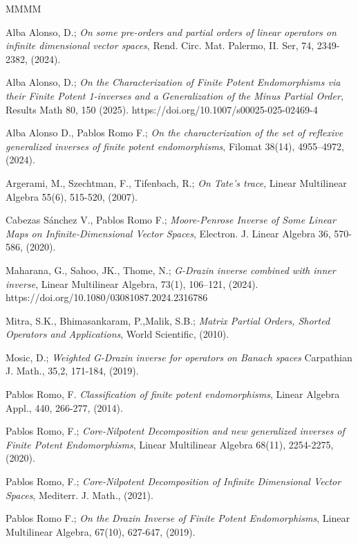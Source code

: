\documentclass[10pt,a4paper]{amsart}
\theoremstyle{plain}
\theoremstyle{remark}
\numberwithin{equation}{section} \numberwithin{defn}{section}
\begin{document}
\begin{thebibliography}{MMMM}

 Alba Alonso, D.; \textit{On some pre-orders and partial orders of linear operators on infinite dimensional vector spaces}, Rend. Circ. Mat. Palermo, II. Ser, 74, 2349-2382, (2024).


 Alba Alonso, D.; \textit{On the Characterization of Finite Potent Endomorphisms via their Finite Potent 1-inverses and a Generalization of the Minus Partial Order}, Results Math 80, 150 (2025). https://doi.org/10.1007/s00025-025-02469-4


 Alba Alonso D., Pablos Romo F.; \textit{On the characterization of the set of reflexive generalized inverses of finite potent endomorphisms}, Filomat 38(14),  4955–4972,  (2024).

  Argerami, M., Szechtman, F., Tifenbach, R.; \textit{On Tate's trace}, Linear Multilinear Algebra 55(6), 515-520, (2007).

 Cabezas Sánchez V., Pablos Romo F.; \textit{Moore-Penrose Inverse of Some Linear Maps on Infinite-Dimensional Vector Spaces}, Electron. J. Linear Algebra 36, 570-586, (2020).


 Maharana, G., Sahoo, JK., Thome, N.; \textit{G-Drazin inverse combined with inner inverse}, Linear Multilinear Algebra, 73(1), 106–121, (2024). https://doi.org/10.1080/03081087.2024.2316786



  Mitra, S.K., Bhimasankaram, P.,Malik, S.B.; \textit{Matrix Partial Orders, Shorted Operators and Applications}, World Scientific, (2010).

 Mosic, D.; \textit{Weighted G-Drazin inverse for operators on Banach spaces} Carpathian J. Math., 35,2, 171-184, (2019).

 
 Pablos Romo, F. \textit{Classification of finite potent endomorphisms}, Linear Algebra Appl., 440, 266-277, (2014).

 Pablos Romo, F.; \textit{Core-Nilpotent Decomposition and new generalized inverses  of  Finite Potent Endomorphisms}, Linear Multilinear Algebra 68(11), 2254-2275, (2020).

  Pablos Romo, F.; \textit{Core-Nilpotent Decomposition of Infinite Dimensional Vector Spaces}, Mediterr. J. Math., (2021).

 Pablos Romo F.; \textit{On the Drazin Inverse of Finite Potent Endomorphisms}, Linear Multilinear Algebra, 67(10), 627-647,  (2019).


\end{thebibliography}
\end{document}
